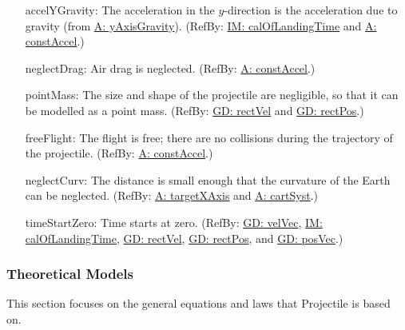 \documentclass[12pt]{article}
\begin{document}
\begin{itemize}
\item[accelYGravity:\phantomsection\label{accelYGravity}]The acceleration in the $y$-direction is the acceleration due to gravity (from \hyperref[yAxisGravity]{A: yAxisGravity}). (RefBy: \hyperref[IM:calOfLandingTime]{IM: calOfLandingTime} and \hyperref[constAccel]{A: constAccel}.)
\item[neglectDrag:\phantomsection\label{neglectDrag}]Air drag is neglected. (RefBy: \hyperref[constAccel]{A: constAccel}.)
\item[pointMass:\phantomsection\label{pointMass}]The size and shape of the projectile are negligible, so that it can be modelled as a point mass. (RefBy: \hyperref[GD:rectVel]{GD: rectVel} and \hyperref[GD:rectPos]{GD: rectPos}.)
\item[freeFlight:\phantomsection\label{freeFlight}]The flight is free; there are no collisions during the trajectory of the projectile. (RefBy: \hyperref[constAccel]{A: constAccel}.)
\item[neglectCurv:\phantomsection\label{neglectCurv}]The distance is small enough that the curvature of the Earth can be neglected. (RefBy: \hyperref[targetXAxis]{A: targetXAxis} and \hyperref[cartSyst]{A: cartSyst}.)
\item[timeStartZero:\phantomsection\label{timeStartZero}]Time starts at zero. (RefBy: \hyperref[GD:velVec]{GD: velVec}, \hyperref[IM:calOfLandingTime]{IM: calOfLandingTime}, \hyperref[GD:rectVel]{GD: rectVel}, \hyperref[GD:rectPos]{GD: rectPos}, and \hyperref[GD:posVec]{GD: posVec}.)
\end{itemize}
\subsubsection{Theoretical Models}
\label{Sec:TMs}
This section focuses on the general equations and laws that Projectile is based on.
\par~
\end{document}
